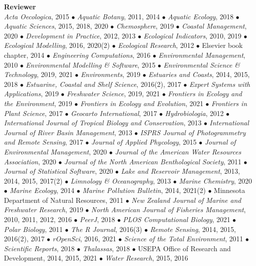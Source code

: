 \documentclass[letterpaper,12pt]{article}
\begin{document}
{\bf Reviewer}\hfill \\
\textit{Acta Oecologica}, 2015 $\bullet$ \textit{Aquatic Botany}, 2011, 2014 $\bullet$ \textit{Aquatic Ecology}, 2018 $\bullet$ \textit{Aquatic Sciences}, 2015, 2018, 2020 $\bullet$ \textit{Chemosphere}, 2019 $\bullet$ \textit{Coastal Management}, 2020 $\bullet$ \textit{Development in Practice}, 2012, 2013 $\bullet$ \textit{Ecological Indicators}, 2010, 2019 $\bullet$ \textit{Ecological Modelling}, 2016, 2020(2) $\bullet$ \textit{Ecological Research}, 2012 $\bullet$ Elsevier book chapter, 2014 $\bullet$ \textit{Engineering Computations}, 2016 $\bullet$ \textit{Environmental Management}, 2010 $\bullet$ \textit{Environmental Modelling \& Software}, 2015 $\bullet$ \textit{Environmental Science \& Technology}, 2019, 2021 $\bullet$ \textit{Environments}, 2019 $\bullet$ \textit{Estuaries and Coasts}, 2014, 2015, 2018 $\bullet$ \textit{Estuarine, Coastal and Shelf Science}, 2016(2), 2017 $\bullet$ \textit{Expert Systems with Applications}, 2019 $\bullet$ \textit{Freshwater Science}, 2019, 2021 $\bullet$ \textit{Frontiers in Ecology and the Environment}, 2019 $\bullet$ \textit{Frontiers in Ecology and Evolution}, 2021 $\bullet$ \textit{Frontiers in Plant Science}, 2017 $\bullet$ \textit{Geocarto International}, 2017 $\bullet$ \textit{Hydrobiologia}, 2012 $\bullet$ \textit{International Journal of Tropical Biology and Conservation}, 2013 $\bullet$ \textit{International Journal of River Basin Management}, 2013 $\bullet$ \textit{ISPRS Journal of Photogrammetry and Remote Sensing}, 2017 $\bullet$ \textit{Journal of Applied Phycology}, 2015 $\bullet$ \textit{Journal of Environmental Management}, 2020 $\bullet$ \textit{Journal of the American Water Resources Association}, 2020 $\bullet$ \textit{Journal of the North American Benthological Society}, 2011 $\bullet$ \textit{Journal of Statistical Software}, 2020 $\bullet$ \textit{Lake and Reservoir Management}, 2013, 2014, 2015, 2017(2) $\bullet$ \textit{Limnology \& Oceanography}, 2013 $\bullet$ \textit{Marine Chemistry}, 2020 $\bullet$ \textit{Marine Ecology}, 2014 $\bullet$ \textit{Marine Pollution Bulletin}, 2014, 2021(2) $\bullet$ Minnesota Department of Natural Resources, 2011 $\bullet$ \textit{New Zealand Journal of Marine and Freshwater Research}, 2019 $\bullet$ \textit{North American Journal of Fisheries Management}, 2010, 2011, 2012, 2016 $\bullet$ \textit{PeerJ}, 2018 $\bullet$ \textit{PLOS Computational Biology}, 2021 $\bullet$ \textit{Polar Biology}, 2011 $\bullet$ \textit{The R Journal}, 2016(3) $\bullet$ \textit{Remote Sensing}, 2014, 2015, 2016(2), 2017 $\bullet$ \textit{rOpenSci}, 2016, 2021 $\bullet$ \textit{Science of the Total Environment}, 2011 $\bullet$ \textit{Scientific Reports}, 2018 $\bullet$ \textit{Thalassas}, 2018 $\bullet$ USEPA Office of Research and Development, 2014, 2015, 2021 $\bullet$ \textit{Water Research}, 2015, 2016
\end{document}
